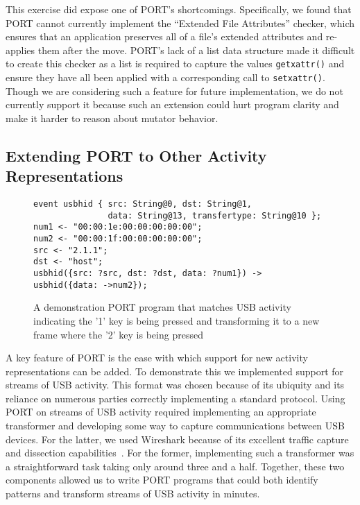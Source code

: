 This exercise did expose one of PORT's shortcomings.  Specifically,
we found that PORT cannot currently implement the ``Extended File
Attributes'' checker, which
 ensures that an application
preserves all of a file's extended attributes and re-applies them after the move.
PORT's lack of a list data structure made it difficult to create this checker as a
list is required to capture the values {\tt getxattr()}
and ensure they have all been applied with a
corresponding call to {\tt setxattr()}.
Though we are considering such a feature for future implementation,
we do not currently support it because such an extension could
hurt program clarity and make it harder to reason about
mutator behavior.


\subsection{Extending PORT to Other Activity Representations}
\begin{figure}
  \begin{lstlisting}[basicstyle=\ttfamily\small,xleftmargin=.8em]
event usbhid { src: String@0, dst: String@1,
               data: String@13, transfertype: String@10 };
num1 <- "00:00:1e:00:00:00:00:00";
num2 <- "00:00:1f:00:00:00:00:00";
src <- "2.1.1";
dst <- "host";
usbhid({src: ?src, dst: ?dst, data: ?num1}) -> usbhid({data: ->num2});
  \end{lstlisting}
  \caption{A demonstration PORT program that matches USB activity indicating the '1' key is being pressed and transforming it to a new frame where the '2' key is being pressed}
  \label{fig:USB}
\end{figure}


A key feature of PORT is the ease with which support for new activity representations
can be added. To demonstrate this
we implemented support for streams of USB activity. This format was chosen because of its ubiquity and its reliance on numerous parties correctly implementing a standard protocol.
Using PORT on streams of USB activity required implementing an appropriate transformer and developing some way to capture communications between USB devices.
For the latter, we used Wireshark because of its excellent traffic capture and dissection capabilities~\cite{wireshark}.
For the former, implementing such a transformer was a straightforward task taking only around three and a half.
Together, these two components allowed us to write PORT programs that could both identify patterns and transform streams of USB activity in minutes.

